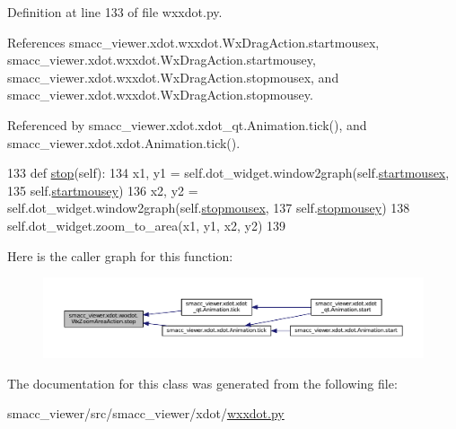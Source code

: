 Definition at line 133 of file wxxdot.\+py.



References smacc\+\_\+viewer.\+xdot.\+wxxdot.\+Wx\+Drag\+Action.\+startmousex, smacc\+\_\+viewer.\+xdot.\+wxxdot.\+Wx\+Drag\+Action.\+startmousey, smacc\+\_\+viewer.\+xdot.\+wxxdot.\+Wx\+Drag\+Action.\+stopmousex, and smacc\+\_\+viewer.\+xdot.\+wxxdot.\+Wx\+Drag\+Action.\+stopmousey.



Referenced by smacc\+\_\+viewer.\+xdot.\+xdot\+\_\+qt.\+Animation.\+tick(), and smacc\+\_\+viewer.\+xdot.\+xdot.\+Animation.\+tick().


\begin{DoxyCode}
133   \textcolor{keyword}{def }\hyperlink{classsmacc__viewer_1_1xdot_1_1wxxdot_1_1WxZoomAreaAction_ab26399a0b0e6f106b93a79ed702c129f}{stop}(self):
134     x1, y1 = self.dot\_widget.window2graph(self.\hyperlink{classsmacc__viewer_1_1xdot_1_1wxxdot_1_1WxDragAction_a5cea936fca87c6c2a0729fa14bb3555f}{startmousex},
135                         self.\hyperlink{classsmacc__viewer_1_1xdot_1_1wxxdot_1_1WxDragAction_aedaff0c78a207d753acc62fe3a7c2aa9}{startmousey})
136     x2, y2 = self.dot\_widget.window2graph(self.\hyperlink{classsmacc__viewer_1_1xdot_1_1wxxdot_1_1WxDragAction_a56d7abcb5e97543ba31cd1f0c894c66e}{stopmousex},
137                         self.\hyperlink{classsmacc__viewer_1_1xdot_1_1wxxdot_1_1WxDragAction_af4c5b01b183ba5f0c9889bcca25fc735}{stopmousey})
138     self.dot\_widget.zoom\_to\_area(x1, y1, x2, y2)
139 
\end{DoxyCode}


Here is the caller graph for this function\+:
\nopagebreak
\begin{figure}[H]
\begin{center}
\leavevmode
\includegraphics[width=350pt]{classsmacc__viewer_1_1xdot_1_1wxxdot_1_1WxZoomAreaAction_ab26399a0b0e6f106b93a79ed702c129f_icgraph}
\end{center}
\end{figure}




The documentation for this class was generated from the following file\+:\begin{DoxyCompactItemize}
\item 
smacc\+\_\+viewer/src/smacc\+\_\+viewer/xdot/\hyperlink{wxxdot_8py}{wxxdot.\+py}\end{DoxyCompactItemize}
